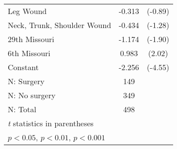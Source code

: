 {\begin{tabular}{l*{1}{cc}}
Leg Wound           &      -0.313         &     (-0.89)\\
Neck, Trunk, Shoulder Wound&      -0.434         &     (-1.28)\\
29th Missouri       &      -1.174         &     (-1.90)\\
6th Missouri        &       0.983\sym{*}  &      (2.02)\\
Constant            &      -2.256\sym{***}&     (-4.55)\\
\hline
N: Surgery          &         149         &            \\
N: No surgery       &         349         &            \\
N: Total            &         498         &            \\
\hline\hline
\multicolumn{3}{l}{\footnotesize \textit{t} statistics in parentheses}\\
\multicolumn{3}{l}{\footnotesize \sym{*} \(p<0.05\), \sym{**} \(p<0.01\), \sym{***} \(p<0.001\)}\\
\end{tabular}
}
